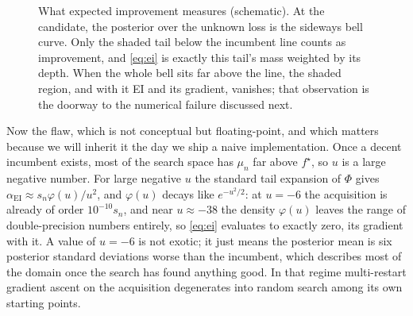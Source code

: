 \begin{figure}[t]
\centering
{}
\caption{What expected improvement measures (schematic). At the candidate,
the posterior over the unknown loss is the sideways bell curve. Only the
shaded tail below the incumbent line counts as improvement, and
\eqref{eq:ei} is exactly this tail's mass weighted by its depth. When the
whole bell sits far above the line, the shaded region, and with it EI and
its gradient, vanishes; that observation is the doorway to the numerical
failure discussed next.}
\label{fig:ei}
\end{figure}

Now the flaw, which is not conceptual but floating-point, and which
matters because we will inherit it the day we ship a naive
implementation. Once a decent incumbent exists, most of the search space
has $\mu_n$ far above $f^{\star}$, so $u$ is a large negative number. For
large negative $u$ the standard tail expansion of $\Phi$ gives
$\alpha_{\mathrm{EI}} \approx s_n \varphi(u)/u^2$, and $\varphi(u)$ decays
like $e^{-u^2/2}$: at $u = -6$ the acquisition is already of order
$10^{-10} s_n$, and near $u \approx -38$ the density $\varphi(u)$ leaves
the range of double-precision numbers entirely, so \eqref{eq:ei} evaluates
to exactly zero, its gradient with it. A value of $u = -6$ is not exotic;
it just means the posterior mean is six posterior standard deviations
worse than the incumbent, which describes most of the domain once the
search has found anything good. In that regime multi-restart gradient
ascent on the acquisition degenerates into random search among its own
starting points.

